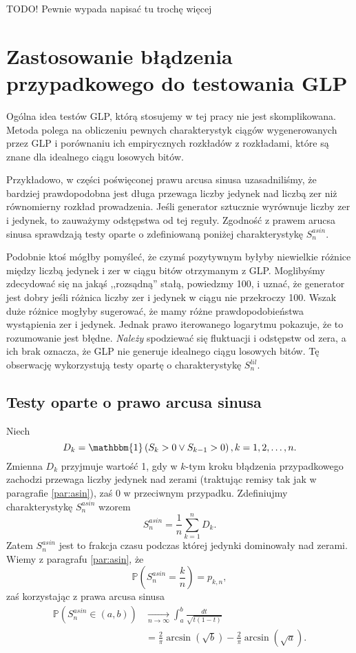 \documentclass[a4paper,11pt,oneside]{book}
\newcommand{\Pro}[1]{\mathbb{P}\left(#1\right)}
\newcommand{\conv}{\rightarrow}
\newcommand{\Slil}[1]{S^{lil}_#1}
\newcommand{\Sasin}[1]{S^{asin}_#1}
\theoremstyle{definition}
\begin{document}
{\bigskip \color{red} \LARGE{TODO!} Pewnie wypada napisać tu trochę więcej}


\section{Zastosowanie błądzenia przypadkowego do testowania GLP}

Ogólna idea testów GLP, którą stosujemy w tej pracy nie jest skomplikowana. Metoda polega na obliczeniu pewnych charakterystyk ciągów wygenerowanych przez GLP i porównaniu ich empirycznych rozkładów z rozkładami, które są znane dla idealnego ciągu losowych bitów.

Przykładowo, w części poświęconej prawu arcusa sinusa uzasadniliśmy, że bardziej prawdopodobna jest długa przewaga liczby jedynek nad liczbą zer niż równomierny rozkład prowadzenia. Jeśli generator sztucznie wyrównuje liczby zer i jedynek, to zauważymy odstępstwa od tej reguły. Zgodność z prawem arucsa sinusa sprawdzają testy oparte o zdefiniowaną poniżej charakterystykę $\Sasin{n}$.

Podobnie ktoś mógłby pomyśleć, że czymś pozytywnym byłyby niewielkie różnice między liczbą jedynek i zer w ciągu bitów otrzymanym z GLP. Moglibyśmy zdecydować się na jakąś ,,rozsądną'' stałą, powiedzmy 100, i uznać, że generator jest dobry jeśli różnica liczby zer i jedynek w ciągu nie przekroczy 100. Wszak duże różnice mogłyby sugerować, że mamy różne prawdopodobieństwa wystąpienia zer i jedynek. Jednak prawo iterowanego logarytmu pokazuje, że to rozumowanie jest błędne. \emph{Należy} spodziewać się fluktuacji i odstępstw od zera, a ich brak oznacza, że GLP nie generuje idealnego ciągu losowych bitów. Tę obserwację wykorzystują testy opartę o charakterystykę $\Slil{n}$.


\subsection{Testy oparte o prawo arcusa sinusa}
Niech
\begin{equation}
D_k = \mathbbm{1}\left(S_k > 0 \vee S_{k-1}>0 \right), k=1,2,\ldots,n.
\end{equation}
Zmienna $D_k$ przyjmuje wartość 1, gdy w $k$-tym kroku błądzenia przypadkowego zachodzi przewaga liczby jedynek nad zerami (traktując remisy tak jak w paragrafie \ref{par:asin}), zaś 0 w przeciwnym przypadku. Zdefiniujmy charakterystykę $\Sasin{n}$ wzorem
\begin{equation}
 \Sasin{n} = \frac{1}{n} \sum_{k=1}^n D_k.
\end{equation}
Zatem $\Sasin{n}$ jest to frakcja czasu podczas której jedynki dominowały nad zerami. Wiemy z paragrafu \ref{par:asin}, że
\[ \Pro{\Sasin{n} = \frac{k}{n}} = p_{k,n}, \]
zaś korzystając z prawa arcusa sinusa
\begin{equation}
\begin{split}
 \label{eq:prob_sasin}
  \Pro{\Sasin{n} \in (a,b)} &\xrightarrow[n \conv \infty]{} \int_a^b \frac{dt}{\sqrt{t(1-t)}}\\
  &= \frac{2}{\pi}\arcsin(\sqrt{b}) - \frac{2}{\pi}\arcsin(\sqrt{a}).
\end{split}
\end{equation}
\end{document}
